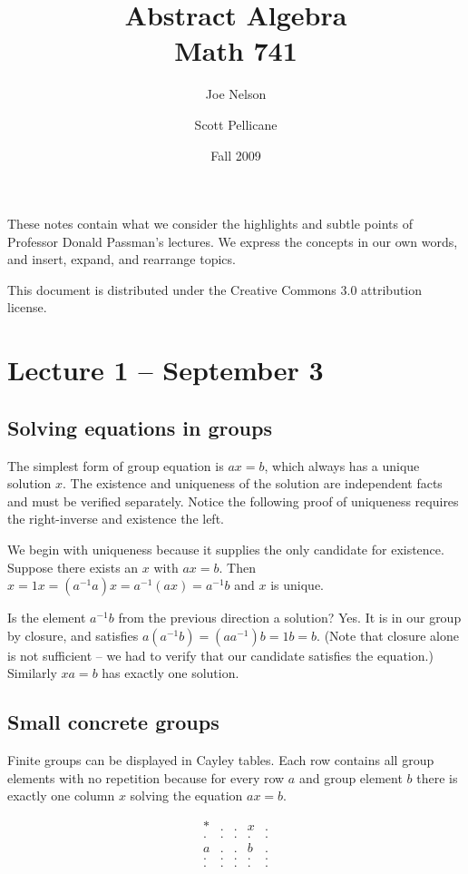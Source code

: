 \documentclass[letterpaper]{article}
\begin{document}
\title{Abstract Algebra\\
Math 741}
\author{Joe Nelson \and Scott Pellicane}
\date{Fall 2009}
\maketitle

These notes contain what we consider the highlights and subtle
points of Professor Donald Passman's lectures. We express the
concepts in our own words, and insert, expand, and rearrange topics.

This document is distributed under the Creative Commons 3.0 attribution
license.

\section{Lecture 1 -- September 3}

\subsection{Solving equations in groups}

The simplest form of group equation is $ax = b$, which always has
a unique solution $x$. The existence and uniqueness of the solution
are independent facts and must be verified separately. Notice the
following proof of uniqueness requires the right-inverse and existence
the left.

We begin with uniqueness because it supplies the only candidate for
existence.  Suppose there exists an $x$ with $ax = b$. Then $x =
1x = (a^{-1}a)x = a^{-1}(ax) = a^{-1}b$ and $x$ is unique.

Is the element $a^{-1}b$ from the previous direction a solution?
Yes. It is in our group by closure, and satisfies $a(a^{-1}b) =
(aa^{-1})b = 1b = b$.  (Note that closure alone is not sufficient
-- we had to verify that our candidate satisfies the equation.)
Similarly $xa = b$ has exactly one solution.

\subsection{Small concrete groups}

Finite groups can be displayed in Cayley tables. Each row contains
all group elements with no repetition because for every row $a$ and
group element $b$ there is exactly one column $x$ solving the
equation $ax = b$.

\[
\begin{array}{r|*{5}{r}}
* & . & . & x & . \\
\hline
. & . & . & . & . \\
a & . & . & b & . \\
. & . & . & . & . \\
. & . & . & . & . \\
\end{array}
\]
\end{document}

